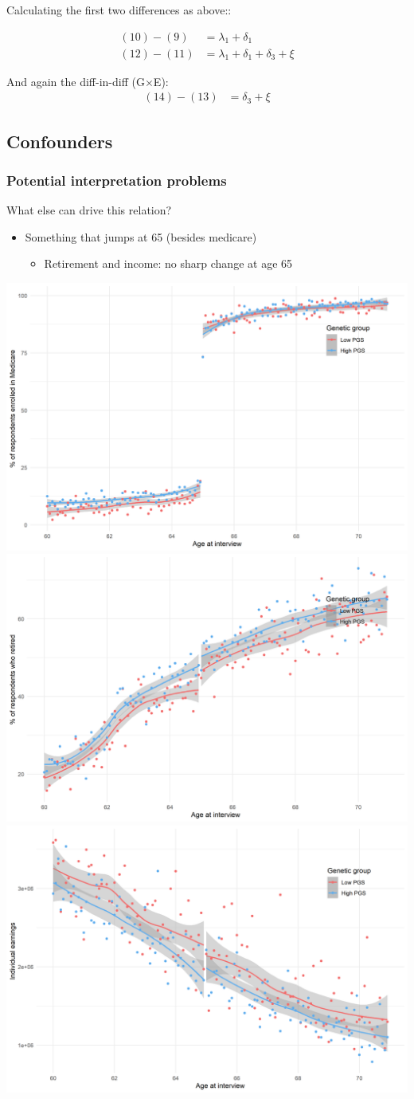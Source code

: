 \documentclass[10pt,compress,xcolor=dvipsnames]{beamer}    %
\newcounter{ex}
\newcommand{\1}[1]{\mathrm{1\hspace*{-2.5pt}l}[#1]}	%
\begin{document}
\begin{frame}
\begin{footnotesize}
Calculating the first two differences as above::

\begin{align}
(10)-(9)&=\lambda_1+\delta_1\\
(12)-(11)&=\lambda_1+\delta_1+\delta_3+\xi
\end{align}

And again the diff-in-diff (G$\times$E):
\begin{align}
(14)-(13)&=\delta_3+\xi
\end{align}
\end{footnotesize}

\end{frame}


\subsection{Confounders}
\begin{frame}
\frametitle{Potential interpretation problems}
\label{frame:interpret}
What else can drive this relation?
\begin{itemize}
	\item Something that jumps at 65 (besides medicare)
	\begin{itemize}
		\item Retirement and income: no sharp change at age 65 \cite{Card2008,Card2009medicare}
	\end{itemize}
\end{itemize}

\vspace{4ex}
\hspace{-4ex}
\includegraphics[width=.36\textwidth]{../../3_output/over_time/graph_6070govmrrdd_agebypgs.png}%
\includegraphics[width=.36\textwidth]{../../3_output/over_time/graph_6070retiredrdd_agebypgs.png}%
\includegraphics[width=.36\textwidth]{../../3_output/over_time/graph_6070iearnrdd_agebypgs.png}

\end{frame}
\end{document}
